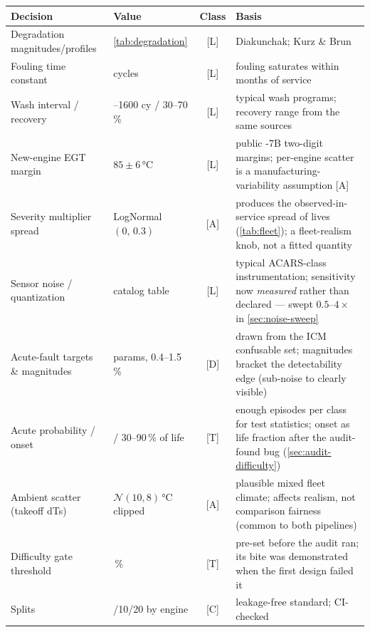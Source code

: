 \begin{center}\footnotesize\setlength{\tabcolsep}{4pt}
\begin{tabular}{>{\raggedright\arraybackslash}p{}>{\raggedright\arraybackslash}p{}c>{\raggedright\arraybackslash}p{}}
  \toprule
  Decision & Value & Class & Basis \\
  \midrule
  Degradation magnitudes/profiles & \cref{tab:degradation} & [L] & Diakunchak; Kurz \& Brun \\
  Fouling time constant & 3000 cycles & [L] & fouling saturates within months of service \\
  Wash interval / recovery & 800--1600 cy / 30--70\,\% & [L] & typical wash programs;
    recovery range from the same sources \\
  New-engine EGT margin & $85\pm6$\,°C & [L] & public -7B two-digit margins; per-engine
    scatter is a manufacturing-variability assumption [A] \\
  Severity multiplier spread & LogNormal $(0,\,0.3)$ & [A] & produces the observed-in-service
    spread of lives (\cref{tab:fleet}); a fleet-realism knob, not a fitted quantity \\
  Sensor noise / quantization & catalog table & [L] & typical ACARS-class instrumentation;
    sensitivity now \emph{measured} rather than declared --- swept $0.5$--$4\times$ in
    \cref{sec:noise-sweep} \\
  Acute-fault targets \& magnitudes & 6 params, 0.4--1.5\,\% & [D] & drawn from the ICM
    confusable set; magnitudes bracket the detectability edge (sub-noise to clearly visible) \\
  Acute probability / onset & 0.5 / 30--90\,\% of life & [T] & enough episodes per class for
    test statistics; onset as life fraction after the audit-found bug (\cref{sec:audit-difficulty}) \\
  Ambient scatter (takeoff dTs) & $\mathcal{N}(10, 8)$\,°C clipped & [A] & plausible mixed
    fleet climate; affects realism, not comparison fairness (common to both pipelines) \\
  Difficulty gate threshold & 60\,\% & [T] & pre-set before the audit ran; its bite was
    demonstrated when the first design failed it \\
  Splits & 70/10/20 by engine & [C] & leakage-free standard; CI-checked \\
  \bottomrule
\end{tabular}
\end{center}

